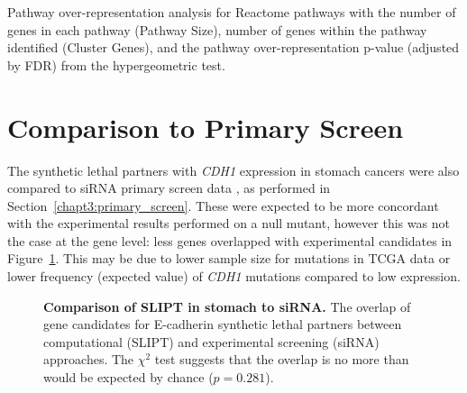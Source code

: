 \begin{table}[!hp]
{\begin{threeparttable}
\begin{tabular}{lccc}
 \hline
\end{tabular}
\begin{tablenotes}
\raggedright %
Pathway over-representation analysis for Reactome pathways with the number of genes in each pathway (Pathway Size), number of genes within the pathway identified (Cluster Genes), and the pathway over-representation p-value (adjusted by \gls{FDR}) from the hypergeometric test.  
\end{tablenotes}
\end{threeparttable}
}
\end{table}


\FloatBarrier

\section{Comparison to Primary Screen} \label{appendix:compare_exprSL_genes_stad}

The synthetic lethal partners with \textit{CDH1} expression in stomach cancers were also compared to \gls{siRNA} primary screen data \citep{Telford2015}, as performed in Section~\ref{chapt3:primary_screen}. These were expected to be more concordant with the experimental results performed on a null mutant, however this was not the case at the gene level: less genes overlapped with experimental candidates in Figure~\ref{fig:Venn_allgenes_stad}. This may be due to lower sample size for mutations in \gls{TCGA} data or lower frequency (expected value) of \textit{CDH1} mutations compared to low expression. 



\begin{figure}[!ht]
  \centering
    \caption[Comparison of SLIPT in stomach to \gls{siRNA}]{\small \textbf{Comparison of SLIPT in stomach to \gls{siRNA}.} The overlap of gene candidates for \gls{E-cadherin} synthetic lethal partners between computational (SLIPT) and experimental screening (siRNA) approaches. The $\chi^2$ test suggests that the overlap is no more than would be expected by chance ($p = 0.281$). %
}
\label{fig:Venn_allgenes_stad}
\end{figure}

